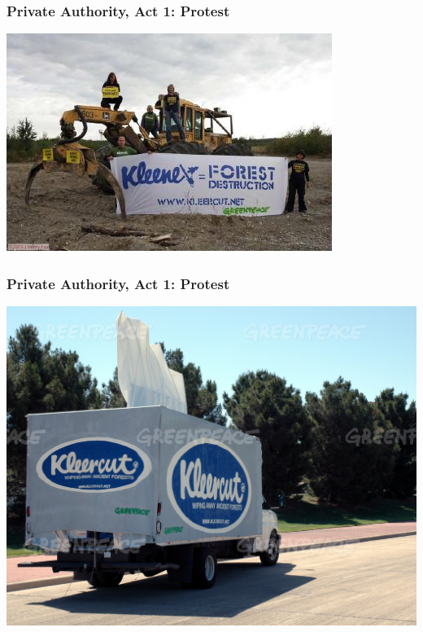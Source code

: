 \documentclass[10pt]{beamer}
\begin{document}
\begin{frame}
\frametitle{Private Authority, Act 1: Protest}
\includegraphics[width = \textwidth]{kleenex}

\end{frame}

\begin{frame}
\frametitle{Private Authority, Act 1: Protest}
\includegraphics[width = \textwidth]{kleenex2}
\end{frame}
\end{document}
